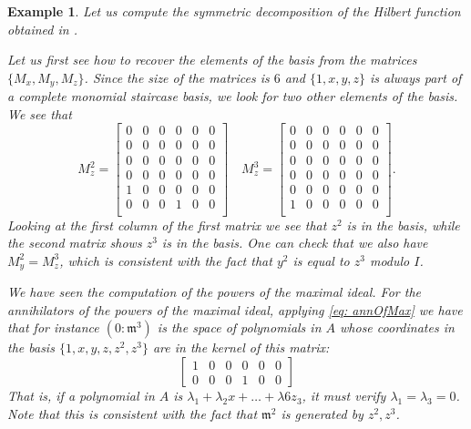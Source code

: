 \documentclass[a4paper,11p]{amsart}
\newcommand{\m}{\mathfrak m}
\newtheorem{example0}[defn0]{Example}
\newenvironment{example}{ \begin{example0}\rm}{\end{example0}}
\begin{document}
\begin{example}\label{Example: SymmetricDecompFromMatrices}
    Let us compute the symmetric decomposition of the Hilbert function obtained in .
\bigskip

    Let us first see how to recover the elements of the basis from the matrices $\{M_x,M_y,M_z\}$. Since the size of the matrices is $6$ and $\{1,x,y,z\}$ is always part of a complete monomial staircase basis, we look for two other elements of the basis. We see that 
    {\scriptsize
\[
M_z^2 =
\begin{bmatrix}
0 & 0 & 0 & 0 & 0 & 0 \\
0 & 0 & 0 & 0 & 0 & 0 \\
0 & 0 & 0 & 0 & 0 & 0 \\
0 & 0 & 0 & 0 & 0 & 0 \\
1 & 0 & 0 & 0 & 0 & 0 \\
0 & 0 & 0 & 1 & 0 & 0 \\
\end{bmatrix}
\quad
M_z^3 =
\begin{bmatrix}
0 & 0 & 0 & 0 & 0 & 0 \\
0 & 0 & 0 & 0 & 0 & 0 \\
0 & 0 & 0 & 0 & 0 & 0 \\
0 & 0 & 0 & 0 & 0 & 0 \\
0 & 0 & 0 & 0 & 0 & 0 \\
1 & 0 & 0 & 0 & 0 & 0 \\
\end{bmatrix}.
\]
}
Looking at the first column of the first matrix we see that $z^2$ is in the basis, while the second matrix shows $z^3$ is in the basis. One can check that we also have $M_y^2=M_z^3$, which is consistent with the fact that $y^2$ is equal to $z^3$ modulo $I$. 

We have seen the computation of the powers of the maximal ideal. For the annihilators of the powers of the maximal ideal, applying \eqref{eq: annOfMax} we have that for instance $(0: \m^3)$ is the space of polynomials in $A$ whose coordinates in the basis $\{1,x,y,z,z^2,z^3\}$ are in the kernel of this matrix: 
\[
\begin{bmatrix}
1 & 0 & 0 & 0 & 0 & 0 \\
0 & 0 & 0 & 1 & 0 & 0 
\end{bmatrix}\]
That is, if a polynomial in $A$ is $\lambda_1+\lambda_2x+\ldots + \lambda6z_3$, it must verify $\lambda_1=\lambda_3=0$. Note that this is consistent with the fact that $\m^2$ is generated by $z^2,z^3$.


\end{example}
\end{document}
